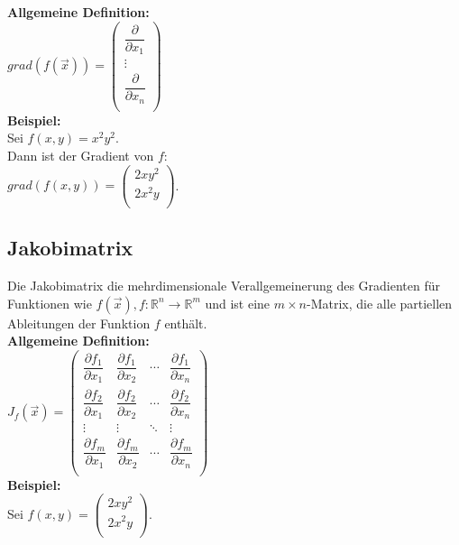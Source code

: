 \documentclass[11pt,final]{scrreprt}
\newcommand{\R} {\mathbb R}
\begin{document}
\textbf{Allgemeine Definition:}\\
$grad(f(\overrightarrow{x})) = \left(\begin{matrix}
\dfrac{\partial}{\partial x_1} \\
\vdots\\
\dfrac{\partial}{\partial x_n} \\
\end{matrix}\right)$\\

\textbf{Beispiel:}\\

Sei $f(x, y) = x^2y^2 $.\\

Dann ist der Gradient von $f$:\\
$grad(f(x, y)) = \left(\begin{matrix}
2xy^2 \\
2x^2y \\
\end{matrix}\right)$.\\

\subsection{Jakobimatrix}
Die Jakobimatrix die mehrdimensionale Verallgemeinerung des Gradienten für Funktionen wie $f(\overrightarrow{x}), f:\R^n \rightarrow \R^m$ und ist eine $m \times n$-Matrix, die alle partiellen Ableitungen der Funktion $f$ enthält.\\

\textbf{Allgemeine Definition:}\\
$J_f(\overrightarrow{x}) = \left(\begin{matrix}
\dfrac{\partial f_1}{\partial x_1} & \dfrac{\partial f_1}{\partial x_2} &\cdots & \dfrac{\partial f_1}{\partial x_n} \\
\dfrac{\partial f_2}{\partial x_1} & \dfrac{\partial f_2}{\partial x_2} &\cdots & \dfrac{\partial f_2}{\partial x_n} \\
\vdots & \vdots & \ddots &\vdots\\
\dfrac{\partial f_m}{\partial x_1} & \dfrac{\partial f_m}{\partial x_2} & \cdots & \dfrac{\partial f_m}{\partial x_n} \\
\end{matrix}\right)$\\

\textbf{Beispiel:}\\
Sei $f(x, y) = \left(\begin{matrix}
2xy^2 \\
2x^2y \\
\end{matrix}\right)$.\\
\end{document}
